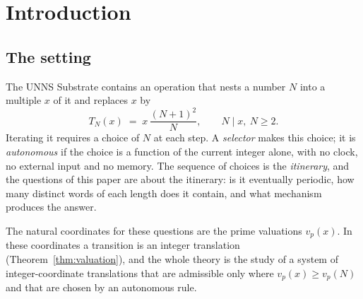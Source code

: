 \tableofcontents
\newpage

\section{Introduction}\label{sec:intro}
\subsection{The setting}
The UNNS Substrate contains an operation that nests a number $N$ into a multiple $x$ of it and replaces $x$ by
\[
T_N(x)\;=\;x\,\frac{(N+1)^2}{N},\qquad N\mid x,\ N\ge2 .
\]
Iterating it requires a choice of $N$ at each step.
A \emph{selector} makes this choice; it is \emph{autonomous} if the choice is a function of the current integer alone, with no clock, no external input and no memory.
The sequence of choices is the \emph{itinerary}, and the questions of this paper are about the itinerary: is it eventually periodic, how many distinct words of each length does it contain, and what mechanism produces the answer.

The natural coordinates for these questions are the prime valuations $v_p(x)$.
In these coordinates a transition is an integer translation (Theorem~\ref{thm:valuation}), and the whole theory is the study of a system of integer-coordinate translations that are admissible only where $v_p(x)\ge v_p(N)$ and that are chosen by an autonomous rule.

